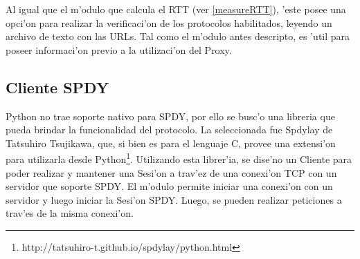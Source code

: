 Al igual que el m'odulo que calcula el RTT (ver \ref{measureRTT}), 'este posee una opci'on para realizar la verificaci'on de los protocolos habilitados, leyendo un archivo de texto con las URLs. Tal como el m'odulo antes descripto, es 'util para poseer informaci'on previo a la utilizaci'on del Proxy.

\subsection{Cliente SPDY}
\label{clienteSPDY}

Python no trae soporte nativo para SPDY, por ello se busc'o una libreria que pueda brindar la funcionalidad del protocolo. La seleccionada fue Spdylay \citep{spdylay} de Tatsuhiro Tsujikawa, que, si bien es para el lenguaje C, provee una extensi'on para utilizarla desde Python\footnote{http://tatsuhiro-t.github.io/spdylay/python.html}. Utilizando esta librer'ia, se dise'no un Cliente para poder realizar y mantener una Sesi'on a trav'ez de una conexi'on TCP con un servidor que soporte SPDY. El m'odulo permite iniciar una conexi'on con un servidor y luego iniciar la Sesi'on SPDY. Luego, se pueden realizar peticiones a trav'es de la misma conexi'on.